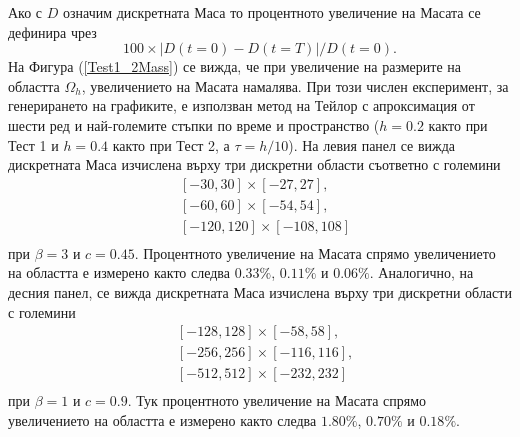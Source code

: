 \documentclass{article}
\newcommand{\rf}[1]{(\ref{#1})}
\begin{document}
\fi
Ако с $D$ означим дискретната Маса то процентното увеличение на Масата се дефинира чрез $$100 \times |D(t=0) - D(t=T)|/D(t=0).$$ На Фигура \rf{Test1_2Mass} се вижда, че при увеличение на размерите на областта $\Omega_h$, увеличението на Масата намалява. При този числен експеримент, за генерирането на графиките, е използван метод на Тейлор с апроксимация от шести ред и най-големите стъпки по време и пространство ($h=0.2$ както при Тест 1 и $h=0.4$ както при Тест 2, а $\tau =  h/10$). На левия панел се вижда дискретната Маса изчислена върху три дискретни области съответно с големини 
\noindent 
\begin{equation*}
\begin{split}
& [-30, 30] \times [-27, 27], \nonumber\\
& [-60, 60] \times [-54, 54], \nonumber\\
& [-120, 120] \times [-108, 108] \nonumber\\
\end{split}
\end{equation*} 
\noindent 
при $\beta =  3$ и $c = 0.45$. Процентното увеличение на Масата спрямо увеличението на областта е измерено както следва $0.33\%$, $0.11\%$ и $0.06\%$. Аналогично, на десния панел, се вижда дискретната Маса изчислена върху три дискретни области с големини 
\noindent 
\begin{equation*}
\begin{split}
& [-128, 128] \times [-58, 58], \nonumber\\
& [-256, 256] \times [-116, 116], \nonumber\\
& [-512, 512] \times [-232, 232] \nonumber\\
\end{split}
\end{equation*} 
\noindent 
при $\beta =  1$ и $c = 0.9$. Тук процентното увеличение на Масата спрямо увеличението на областта е измерено както следва $1.80\%$, $0.70\%$ и $0.18\%$.
\end{document}
